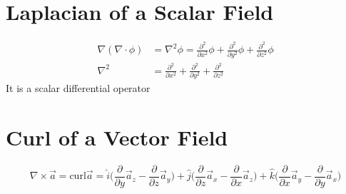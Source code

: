 \documentclass[a4paper, 11pt, normalem]{report}
\newcommand\p{\partial}
\begin{document}
\section{Laplacian of a Scalar Field}
\begin{align*}
    \nabla(\nabla\cdot\phi) &= \nabla^2\phi = \frac{\p^2}{\p x^2}\phi + \frac{\p^2}{\p y^2}\phi + \frac{\p^2}{\p z^2}\phi \\
    \nabla^2 &= \frac{\p^2}{\p x^2} + \frac{\p^2}{\p y^2} + \frac{\p^2}{\p z^2}
\end{align*}
It is a scalar differential operator

\section{Curl of a Vector Field}
\begin{equation*}
    \nabla \times \vec{a} = \text{curl}\vec{a} = \hat{i}\Big(\frac{\p}{\p y}\vec{a}_z - \frac{\p}{\p z}\vec{a}_y\Big) + \hat{j}\Big(\frac{\p}{\p z}\vec{a}_x - \frac{\p}{\p x}\vec{a}_z\Big) + \hat{k}\Big(\frac{\p}{\p x}\vec{a}_y - \frac{\p}{\p y}\vec{a}_x\Big)
\end{equation*}
\end{document}
